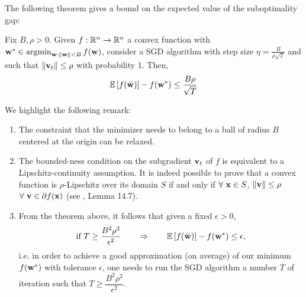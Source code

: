 \documentclass{article}
\begin{document}
 


The following theorem gives a bound on the expected value of the suboptimality gap:
\begin{thm}
Fix $B, \rho>0$. Given $f: \mathbb{R}^n \to \mathbb{R}^n$ a convex function with ${\bf w}^\ast \in \operatorname{argmin}_{{\bf w}: \|{\bf w}\|<B} f({\bf w})$, consider a SGD algorithm with step size $\eta = \frac{B}{\rho\sqrt{T}}$ and such that $\|{\bf v}_t\|\leq \rho$ with probability 1. Then, 
\begin{gather}
\mathbb{E} \left[f(\bar{\bf w}) \right] - f({\bf w}^\ast) \leq \dfrac{B\rho}{\sqrt{T}}
\end{gather}
\end{thm}


We highlight the following remark:
\begin{enumerate}
\item The constraint that the minimizer needs to belong to a ball of radius $B$ centered at the origin can be relaxed.
\item The bounded-ness condition on the subgradient ${\bf v}_t$ of $f$ is equivalent to a Lipschitz-continuity assumption. It is indeed possible to prove that a convex function is $\rho$-Lipschitz over its domain $S$ if and only if $\forall \ {\bf x} \in S$, $\|{\bf v}\| \leq \rho$ $\forall \ {\bf v} \in \partial f({\bf x})$ (see \cite{Shalev2014}, Lemma 14.7).
\item From the theorem above, it follows that given a fixed $\epsilon>0$, 
$$ \text{if  }  T \geq \dfrac{B^2\rho^2}{\epsilon^2} \qquad \Rightarrow \qquad \mathbb{E} \left[f(\bar{\bf w}) \right] - f({\bf w}^\ast) \leq \epsilon, $$
i.e. in order to achieve a good approximation (on average) of our minimum $f({\bf w}^\ast)$ with tolerance $\epsilon$, one needs to run the SGD algorithm a number $T$ of iteration such that $T \geq \dfrac{B^2\rho^2}{\epsilon^2}$.
\end{enumerate}
\end{document}

